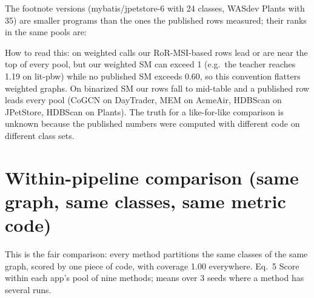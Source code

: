 \documentclass[10pt,a4paper]{article}
\begin{document}
The footnote versions (mybatis/jpetstore-6 with 24 classes, WASdev Plants with 35) are smaller programs than the ones the published rows measured; their ranks in the same pools are:
\begin{center}\small{}\end{center}
How to read this: on weighted calls our RoR-MSI-based rows lead or are near the top of every pool, but our weighted SM can exceed 1 (e.g.\ the teacher reaches 1.19 on lit-pbw) while no published SM exceeds 0.60, so this convention flatters weighted graphs. On binarized SM our rows fall to mid-table and a published row leads every pool (CoGCN on DayTrader, MEM on AcmeAir, HDBScan on JPetStore, HDBScan on Plants). The truth for a like-for-like comparison is unknown because the published numbers were computed with different code on different class sets.
\section{Within-pipeline comparison (same graph, same classes, same metric code)}
This is the fair comparison: every method partitions the same classes of the same graph, scored by one piece of code, with coverage 1.00 everywhere. Eq.~5 Score within each app's pool of nine methods; means over 3 seeds where a method has several runs.
\end{document}
